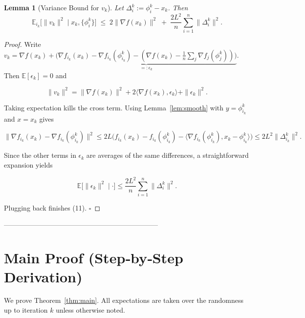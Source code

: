 \documentclass{article}
\newtheorem{lemma}{Lemma}
\newcommand{\E}{\mathbb{E}}
\newcommand{\grad}{\nabla}
\begin{document}
\begin{lemma}[Variance Bound for $v_k$]\label{lem:var}
Let $\Delta_i^{k}:=\phi_i^{k}-x_k$. Then
\[
\E_{i_k}\!\bigl[\|v_k\|^{2}\mid x_k,\{\phi_i^{k}\}\bigr]
\;\le\;
2\|\grad f(x_k)\|^{2}
\;+\; \frac{2L^{2}}{n}\sum_{i=1}^{n}\|\Delta_i^{k}\|^{2}.
\tag{11}
\]
\end{lemma}
\begin{proof}
Write $v_k=\grad f(x_k)+\underbrace{\bigl(\grad f_{i_k}(x_k)-\grad f_{i_k}(\phi_{i_k}^{k})-
(\grad f(x_k)-\frac1n\sum_j\grad f_j(\phi_j^{k}))\bigr)}_{=: \epsilon_k}$.
Then $\E[\epsilon_k]=0$ and  

\[
\|v_k\|^{2}= \|\grad f(x_k)\|^{2}+2\langle\grad f(x_k),\epsilon_k\rangle+\|\epsilon_k\|^{2}.
\]

Taking expectation kills the cross term. Using Lemma~\ref{lem:smooth} with $y=\phi_{i_k}^{k}$ and $x=x_k$ gives  

\[
\|\grad f_{i_k}(x_k)-\grad f_{i_k}(\phi_{i_k}^{k})\|^{2}
\le 2L\bigl(f_{i_k}(x_k)-f_{i_k}(\phi_{i_k}^{k})-\langle\grad f_{i_k}(\phi_{i_k}^{k}),x_k-\phi_{i_k}^{k}\rangle\bigr)
\le 2L^{2}\|\Delta_{i_k}^{k}\|^{2}.
\]

Since the other terms in $\epsilon_k$ are averages of the same differences, a straightforward expansion yields  

\[
\E\!\bigl[\|\epsilon_k\|^{2}\mid\cdot\bigr]\le \frac{2L^{2}}{n}\sum_{i=1}^{n}\|\Delta_i^{k}\|^{2}.
\]

Plugging back finishes (11). \hfill $\square$
\end{proof}

--------------------------------------------------------------------

\section*{Main Proof (Step‑by‑Step Derivation)}
We prove Theorem~\ref{thm:main}.  All expectations are taken over the randomness up to iteration $k$ unless otherwise noted.
\end{document}
